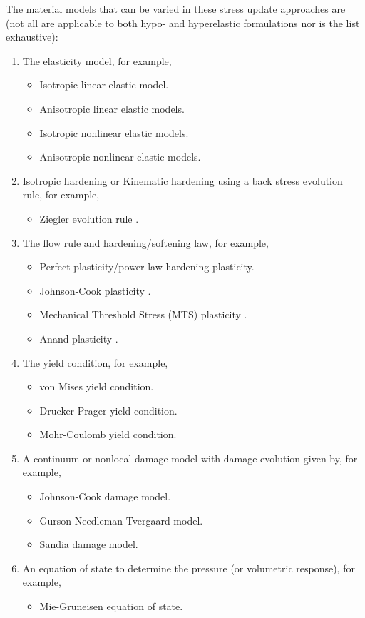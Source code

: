 \documentclass[10pt]{article}
\begin{document}
  The material models that can be varied in these stress update approaches
  are (not all are applicable to both hypo- and hyperelastic formulations
  nor is the list exhaustive):
  \begin{enumerate}
    \item The elasticity model, for example, 
      \begin{itemize}
        \item Isotropic linear elastic model. 
        \item Anisotropic linear elastic models.
        \item Isotropic nonlinear elastic models.
        \item Anisotropic nonlinear elastic models.
      \end{itemize}
    \item Isotropic hardening or Kinematic hardening using a 
          back stress evolution rule, for example,
      \begin{itemize}
        \item Ziegler evolution rule   .
      \end{itemize}
    \item The flow rule and hardening/softening law, for example,
      \begin{itemize} 
        \item Perfect plasticity/power law hardening plasticity.
        \item Johnson-Cook plasticity .
        \item Mechanical Threshold Stress (MTS) plasticity .
        \item Anand plasticity .
      \end{itemize} 
    \item The yield condition, for example,
      \begin{itemize} 
        \item von Mises yield condition.
        \item Drucker-Prager yield condition.
        \item Mohr-Coulomb yield condition.
      \end{itemize} 
    \item A continuum or nonlocal damage model with damage evolution
          given by, for example, 
      \begin{itemize}
        \item Johnson-Cook damage model.
        \item Gurson-Needleman-Tvergaard model.
        \item Sandia damage model.
      \end{itemize}
    \item An equation of state to determine the pressure (or 
          volumetric response), for example, 
      \begin{itemize}
        \item Mie-Gruneisen equation of state.
      \end{itemize}
  \end{enumerate}
  
\end{document}
